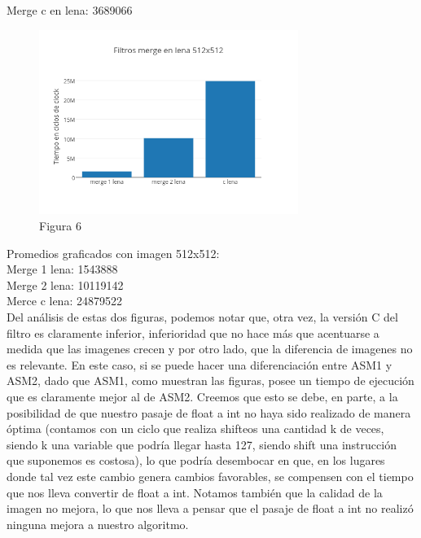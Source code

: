 \documentclass[a4paper]{article}
\begin{document}
Merge c en lena: 3689066
\\

\begin{figure}[h]
  \centering
    \includegraphics[width=0.75\textwidth]{imagenes/FiltrosMergeEnLena512x512.png}
  \caption{Figura 6}
  \label{fig:graficomerge2}
\end{figure}
 \FloatBarrier

Promedios graficados con imagen 512x512:
\\

Merge 1 lena: 1543888
\\

Merge 2 lena: 10119142
\\

Merce c lena: 24879522
\\

Del análisis de estas dos figuras, podemos notar que, otra vez, la versión C del filtro es claramente inferior, inferioridad que no hace más que acentuarse a medida que las imagenes crecen y por otro lado, que la diferencia de imagenes no es relevante. En este caso, si se puede hacer una diferenciación entre ASM1 y ASM2, dado que ASM1, como muestran las figuras, posee un tiempo de ejecución que es claramente mejor al de ASM2. Creemos que esto se debe, en parte, a la posibilidad de que nuestro pasaje de float a int no haya sido realizado de manera óptima (contamos con un ciclo que realiza shifteos una cantidad k de veces, siendo k una variable que podría llegar hasta 127, siendo shift una instrucción que suponemos es costosa), lo que podría desembocar en que, en los lugares donde tal vez este cambio genera cambios favorables, se compensen con el tiempo que nos lleva convertir de float a int.	Notamos también que la calidad de la imagen no mejora, lo que nos lleva a pensar que el pasaje de float a int no realizó ninguna mejora a nuestro algoritmo. 
\end{document}
